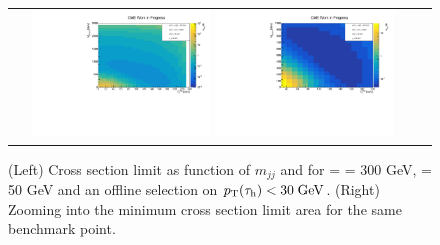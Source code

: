 \begin{figure}[tbh!]
	\centering
	\begin{tabular}{cc}
		\includegraphics[width=0.45\textwidth]{analysis/pics/JetInvMass_vs_MET_xsec_chi300_lsp050_taupt30.pdf}
		\includegraphics[width=0.45\textwidth]{analysis/pics/JetInvMass_vs_MET_xsec_chi300_lsp050_taupt30_zoom.pdf}
	\end{tabular}
	\caption{(Left) Cross section limit as function of $m_{jj}$ and \met for \charginopm = \neutralinotwo = 300 GeV, \neutralinoone = 50 GeV and an offline selection on $p_{\text{T}}(\tau_{\text{h}}) <  30\;\text{Ge}\kern-0.06667em\text{V}$. (Right) Zooming into the minimum cross section limit area for the same benchmark point.}
	\label{fig::JetInvMass_vs_MET_xsec_chi300_lsp050_taupt30}
\end{figure}

